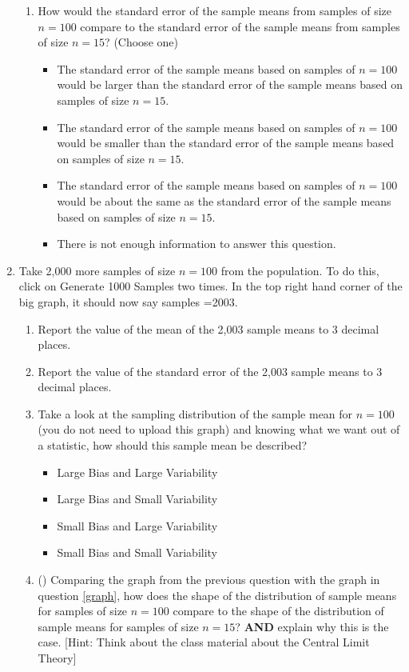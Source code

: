 \begin{enumerate}
\begin{enumerate}
\item How would the standard error of the sample means from samples of size $n=100$ compare to the standard error of the sample means from samples of size $n=15$?  (Choose one)
	\begin{itemize}
	\item The standard error of the sample means based on samples of $n=100$ would be larger than the standard error of the sample means based on samples of size $n=15$.
	\item  The standard error of the sample means based on samples of $n=100$ would be smaller than the standard error of the sample means based on samples of size $n=15$.
	\item The standard error of the sample means based on samples of $n=100$ would be about the same as the standard error of the sample means based on samples of size $n=15$.
	\item There is not enough information to answer this question.\\
	\end{itemize}
\end{enumerate}

\item Take 2,000 more samples of size $n=100$ from the population. To do this, click on Generate 1000 Samples two times. In the top right hand corner of the big graph, it should now say samples =2003.
\begin{enumerate}
\item Report the value of the mean of the 2,003 sample means to 3 decimal places. 
\item Report the value of the standard error of the 2,003 sample means to 3 decimal places.
\item \label{graph2} Take a look at the sampling distribution of the sample mean for $n=100$ (you do not need to upload this graph) and knowing what we want out of a statistic, how should this sample mean be described?
\begin{itemize}
	\item Large Bias and Large Variability
	\item Large Bias and Small Variability
	\item Small Bias and Large Variability
	\item Small Bias and Small Variability
\end{itemize}
\item (\textbf{}) Comparing the graph from the previous question with the graph in question \ref{graph}, how does the shape of the distribution of sample means for samples of size $n=100$ compare to the shape of the distribution of sample means for samples of size $n=15$?  \textbf{AND }explain why this is the case. [Hint: Think about the class material about the Central Limit Theory] \\
\end{enumerate}
\end{enumerate}

